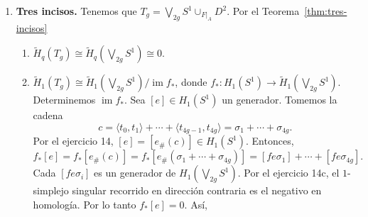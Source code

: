 \documentclass[11pt,a4paper]{article}
\theoremstyle{plain}
\theoremstyle{definition}
\theoremstyle{remark}
\newcommand{\ZZ}{\mathbb Z}
\newcommand{\CC}{\mathbb C}
\DeclareMathOperator{\ran}{ran}
\DeclareMathOperator{\im}{im}
\begin{document}
\begin{enumerate}[label=\arabic*.,leftmargin=*]
\begin{enumerate}[label=\alph*)]
$\CC P^n\cong\CC P^{n-1}\cup_fD^{2n}$. Por el
Teorema~\ref{thm:tres-incisos}:
\begin{enumerate}[label=\arabic*)]
\item $\tilde H_q(\CC P^n)\cong\tilde H_q(\CC P^{n-1})$, $q\ne2n,2n-1$.
\item $\tilde H_{2n-1}(\CC P^n)\cong\tilde H_{2n-1}(\CC P^{n-1})/\im f_*$,
en donde
\[
f_*:\tilde H_{2n-1}(S^{2n-1})\to\tilde H_{2n-1}(\CC P^{n-1})=0
\]
\item $0\to\tilde H_{2n}(\CC P^{n-1})=0\to\tilde H_{2n}(\CC P^n)\xrightarrow{\cong}\ker f_*\cong\tilde H_{2n-1}(S^{2n-1})\cong R$
\end{enumerate}
\begin{itemize}
\item \textbf{Celular.} Se tiene que $\CC P^n=\bigcup_{k=0}^n\Gamma^{2k}$
en donde $\Gamma^{2k}=\{e^{2k}\}$ para $0\le2k\le2n$. Por el
Teorema~\ref{thm:cw-celular}, $H_q(\CC P^n)=0$ para $q>2n$. También, ya que
las células de $\CC P^n$ no están en dimensiones adyacentes, la
Observación~\ref{obs:cw-observaciones} implica que
\[
H_q(\CC P^n)=\begin{cases}R & q=0,\dots,2n\\0 & \text{e.o.c.}\end{cases}
\]
\item \textbf{Cálculo de $\chi(\CC P^n)$.}
\[
\chi(\CC P^n)=\sum_{q\ge0}(-1)^q\ran\big(H_q(\CC P^n;\ZZ)\big)
=\sum_{j=0}^n(-1)^{2j}\ran\big(H_{2j}(\CC P^n;\ZZ)\big)
=n+1.
\]
\end{itemize}
\item \textbf{Tres incisos.} Tenemos que
$T_g=\bigvee_{2g}S^1\cup_{F|_A}D^2$. Por el Teorema~\ref{thm:tres-incisos}
\begin{enumerate}[label=\arabic*)]
\item $\tilde H_q(T_g)\cong\tilde H_q\left(\bigvee_{2g}S^1\right)\cong0$.
\item $\tilde H_1(T_g)\cong\tilde H_1\left(\bigvee_{2g}S^1\right)/\im f_*$,
donde $f_*:H_1(S^1)\to\tilde H_1\left(\bigvee_{2g}S^1\right)$. Determinemos
$\im f_*$. Sea $[e]\in H_1(S^1)$ un generador. Tomemos la cadena
\[
c=\langle t_0,t_1\rangle+\cdots+\langle t_{4g-1},t_{4g}\rangle=\sigma_1+\cdots+\sigma_{4g}.
\]
Por el ejercicio 14, $[e]=[e_\#(c)]\in H_1(S^1)$. Entonces,
\[
f_*[e]=f_*[e_\#(c)]=f_*[e_\#(\sigma_1+\cdots+\sigma_{4g})]=[fe\sigma_1]+\cdots+[fe\sigma_{4g}].
\]
Cada $[fe\sigma_i]$ es un generador de $H_1\left(\bigvee_{2g}S^1\right)$.
Por el ejercicio 14c, el $1$-simplejo singular recorrido en dirección
contraria es el negativo en homología. Por lo tanto $f_*[e]=0$. Así,

\end{enumerate}
\end{enumerate}
\end{enumerate}
\end{document}
